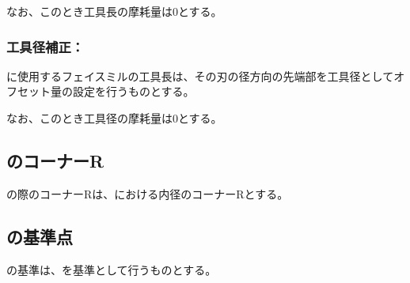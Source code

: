 なお、このとき工具長の摩耗量は0とする。

\subsubsection{工具径補正：\EndFacecutMilling}
\EndFacecutMilling に使用するフェイスミルの工具長は、その刃の径方向の先端部を工具径としてオフセット量の設定を行うものとする。

なお、このとき工具径の摩耗量は0とする。


\subsection{\EndFacecutMilling のコーナーR}
\EndFacecutMilling の際のコーナーRは、\nameEndFace における内径のコーナーRとする。



\clearpage


\subsection{\OutcutMilling の基準点}
\OutcutMilling の基準は、\OutcutCenter を基準として行うものとする。


